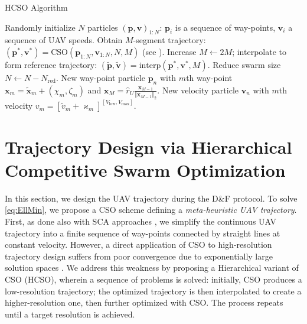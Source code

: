 \documentclass[12pt, draftcls, onecolumn]{IEEEtran}
\theoremstyle{plain}
\theoremstyle{definition}
\theoremstyle{remark}
\begin{document}
\begin{algorithm} [t]
\caption{HCSO Algorithm}\label{A3}
    \begin{algorithmic}[1]
        \scriptsize
    	\State Randomly initialize $N$ particles $(\mathbf p,\mathbf v)_{1:N}$: $\mathbf p_i$ is a sequence of way-points,  $\mathbf{v}_{i}$ a sequence of UAV speeds.
    		\State Obtain $M$-segment trajectory: $(\mathbf{p}^{*},\mathbf{v}^{*}){=}\mathrm{CSO}(\mathbf{p}_{1:N},\mathbf{v}_{1:N},N,M)$ (see \cite{CSO}). 
    		\State Increase $M{\gets}2M$; interpolate to form reference trajectory: $(\tilde{\mathbf{p}},\tilde{\mathbf{v}}){=}\mathrm{interp}(\mathbf{p}^{*},\mathbf{v}^{*},M)$. 
    		\State Reduce swarm size $N{\gets}N{-}N_{\mathrm{red}}$.
              \State New way-point particle $\mathbf p_{n}$ with $m$th way-point $\mathbf x_m=\tilde{\mathbf{x}}_{m}{+}(\chi_{m},\zeta_{m})$
              and $\mathbf x_M=\hat r_U\frac{\mathbf{x}_{M{-}1}}{\Vert\mathbf{x}_{M{-}1}\Vert_2}$.
              \State New velocity particle $\mathbf v_{n}$ with $m$th velocity $v_m=[\tilde{v}_{m}{+}\varkappa_{m}]^{[V_{\mathrm{low}},V_{\mathrm{max}}]}$. 
    		\EndFor
    	\EndWhile
    \end{algorithmic}
\end{algorithm}
\vspace{-2mm}

\section{Trajectory Design via Hierarchical Competitive Swarm Optimization}\label{S4}
In this section, we design the UAV trajectory during the D\&F protocol. To solve \eqref{eq:EllMin}, we propose a CSO scheme \cite{CSO} defining a \emph{meta-heuristic UAV trajectory}. First, as done also with SCA approaches \cite{SCA,CSCA-ADMM,EnergyEfficientUAVs}, we simplify the continuous UAV trajectory into a finite sequence of way-points connected by straight lines at constant velocity. However, a direct application of CSO to high-resolution trajectory design suffers from poor convergence due to exponentially large solution spaces \cite{HighDimensionality}. We address this weakness by proposing a Hierarchical variant of CSO (HCSO), wherein a sequence of problems is solved: initially, CSO produces a low-resolution trajectory; the optimized trajectory is then interpolated to create a higher-resolution one, then further optimized with CSO. The process repeats until a target resolution is achieved.
\end{document}
